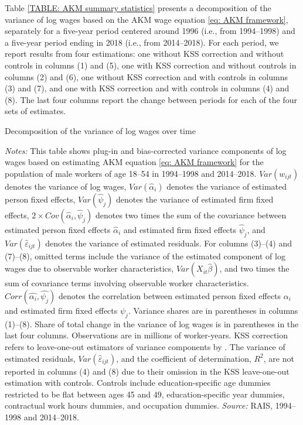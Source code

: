 Table \ref{TABLE: AKM summary statistics} presents a decomposition of the variance of log wages based on the AKM wage equation \eqref{eq: AKM framework}, separately for a five-year period centered around 1996 (i.e., from 1994--1998) and a five-year period ending in 2018 (i.e., from 2014--2018). For each period, we report results from four estimations: %
%
one without KSS correction and without controls in columns (1) and (5), %
one with KSS correction and without controls in columns (2) and (6), %
one without KSS correction and with controls in columns (3) and (7), and %
one with KSS correction and with controls in columns (4) and (8). %
%
The last four columns report the change between periods for each of the four sets of estimates.

\begin{table}[!htb]
  \centering
  \caption{\label{TABLE: AKM summary statistics}Decomposition of the variance of log wages over time}%
  \pretabvspace
  
  \posttabvspace
  \begin{minipage}[t]{1\columnwidth}%
    \begin{spacing}{0.75}
      \emph{\scriptsize{}Notes: }{\scriptsize{}This table shows plug-in and bias-corrected variance components of log wages based on estimating AKM equation \eqref{eq: AKM framework} for the population of male workers of age 18--54 in 1994--1998 and 2014--2018. $Var(w_{ijt})$ denotes the variance of log wages, $Var(\hat{\alpha}_{i})$ denotes the variance of estimated person fixed effects, $Var(\hat{\psi}_{j})$ denotes the variance of estimated firm fixed effects, $2\times Cov(\hat{\alpha}_{i},\hat{\psi}_{j})$ denotes two times the sum of the covariance between estimated person fixed effects $\hat{\alpha}_{i}$ and estimated firm fixed effects $\hat{\psi}_{j}$, and $Var(\hat{\varepsilon}_{ijt})$ denotes the variance of estimated residuals. For columns (3)--(4) and (7)--(8), omitted terms include the variance of the estimated component of log wages due to observable worker characteristics, $Var(X_{it}\hat{\beta})$, and two times the sum of covariance terms involving observable worker characteristics. $Corr\left(\hat{\alpha_{i}},\hat{\psi_{j}}\right)$ denotes the correlation between estimated person fixed effects $\alpha_{i}$ and estimated firm fixed effects $\psi_{j}$. Variance shares are in parentheses in columns (1)--(8). Share of total change in the variance of log wages is in parentheses in the last four columns. Observations are in millions of worker-years. KSS correction refers to leave-one-out estimators of variance components by \citet{KlineSaggioSolvsten2020}. The variance of estimated residuals, $Var(\hat{\varepsilon}_{ijt})$, and the coefficient of determination, $R^2$, are not reported in columns (4) and (8) due to their omission in the KSS leave-one-out estimation with controls. Controls include education-specific age dummies restricted to be flat between ages 45 and 49, education-specific year dummies, contractual work hours dummies, and occupation dummies. %
      \emph{\scriptsize{}Source:} RAIS, 1994--1998 and 2014--2018.}
    \end{spacing}
  \end{minipage}
\end{table}

